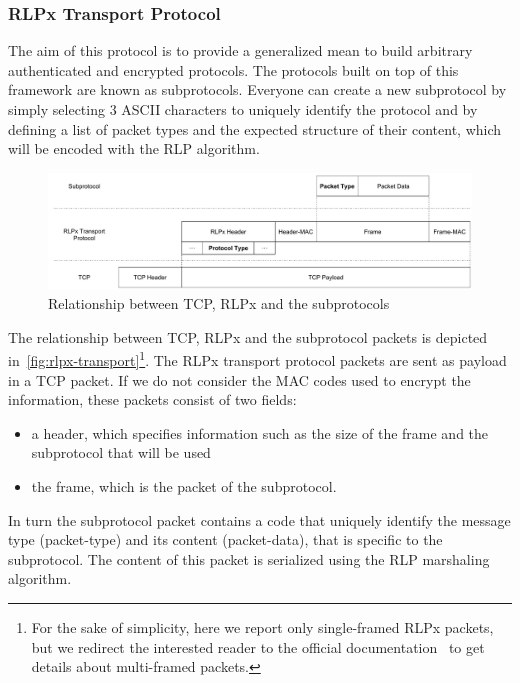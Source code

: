 \subsubsection{RLPx Transport Protocol}
\label{sec:rlpx-transport-protocol}

The aim of this protocol is to provide a generalized mean to build arbitrary
authenticated and encrypted protocols. The protocols built on top of this
framework are known as subprotocols. Everyone can create a new subprotocol by
simply selecting $3$ ASCII characters to uniquely identify the protocol and by
defining a list of packet types and the expected structure of their content,
which will be encoded with the RLP algorithm.

\begin{figure}
  \begin{center}
    \includegraphics[width=\textwidth]{./res/img/rlpx-transport}
    \caption{Relationship between TCP, RLPx and the subprotocols}
    \label{fig:rlpx-transport}
  \end{center}
\end{figure}

The relationship between TCP, RLPx and the subprotocol packets is depicted
in~\autoref{fig:rlpx-transport}\footnote{For the sake of simplicity, here we
report only single-framed RLPx packets, but we redirect the interested reader to
the official documentation~\cite{rlpx} to get details about multi-framed
packets.}. The RLPx transport protocol packets are sent as payload in a TCP
packet. If we do not consider the MAC codes used to encrypt the information,
these packets consist of two fields:
\begin{itemize}
  \item a header, which specifies information such as the size of the frame and
  the subprotocol that will be used
  \item the frame, which is the packet of the subprotocol.
\end{itemize}

In turn the subprotocol packet contains a code that uniquely identify the
message type (packet-type) and its content (packet-data), that is specific to 
the subprotocol. The content of this packet is serialized using the RLP 
marshaling algorithm.

